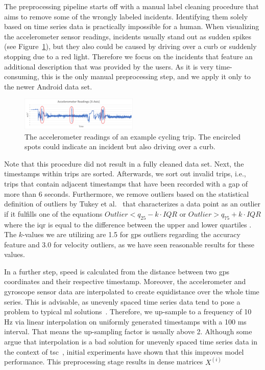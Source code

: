 The preprocessing pipeline starts off with a manual label cleaning procedure that aims to remove some of the wrongly labeled incidents.
Identifying them solely based on time series data is practically impossible for a human.
When visualizing the accelerometer sensor readings, incidents usually stand out as sudden spikes (see Figure~\ref{fig:x-axis}), but they also could be caused by driving over a curb or suddenly stopping due to a red light.
Therefore we focus on the incidents that feature an additional description that was provided by the users.
As it is very time-consuming, this is the only manual preprocessing step, and we apply it only to the newer Android data set.
\begin{figure}%
	\centering
	\includegraphics[width=0.5\textwidth]{fig/accelerometer-x-axis.png}
	\caption{The accelerometer readings of an example cycling trip. The encircled spots could indicate an incident but also driving over a curb.}
	\label{fig:x-axis}
\end{figure}
Note that this procedure did not result in a fully cleaned data set.
Next, the timestamps within trips are sorted.
Afterwards, we sort out invalid trips, i.e., trips that contain adjacent timestamps that have been recorded with a gap of more than 6 seconds.
Furthermore, we remove outliers based on the statistical definition of outliers by Tukey et al.~\cite{tukey1977exploratory} that characterizes a data point as an outlier if it fulfills one of the equations $Outlier < q_{25} - k \cdot IQR$ or $Outlier > q_{75} + k \cdot IQR$ where the \ac{iqr} is equal to the difference between the upper and lower quartiles \cite{upton1996understanding, zwillinger1999crc}.
The $k$-values we are utilizing are 1.5 for \ac{gps} outliers regarding the accuracy feature and 3.0 for velocity outliers, as we have seen reasonable results for these values.

In a further step, speed is calculated from the distance between two \ac{gps} coordinates and their respective timestamp.
Moreover, the accelerometer and gyroscope sensor data are interpolated to create equidistance over the whole time series.
This is advisable, as unevenly spaced time series data tend to pose a problem to typical \ac{ml} solutions~\cite{weerakody2021review}.
Therefore, we up-sample to a frequency of 10 Hz via linear interpolation on uniformly generated timestamps with a 100 ms interval.
That means the up-sampling factor is usually above 2.
Although some argue that interpolation is a bad solution for unevenly spaced time series data in the context of \ac{tsc}~\cite{hayashi2005covariance, eckner2012framework}, initial experiments have shown that this improves model performance.
This preprocessing stage results in dense matrices $X^{(i)}$

